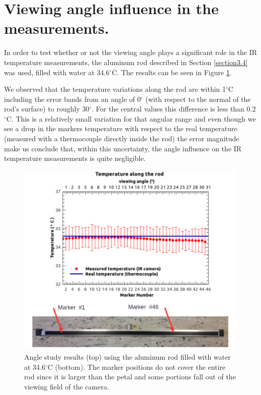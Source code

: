 	\section{Viewing angle influence in the measurements.}\label{section4.5}
	
		In order to test whether or not the viewing angle plays a significant role in the IR temperature measurements, the aluminum rod described in Section \ref{section3.4} was used, filled with water at 34.6\space$^{\circ}$C. The results can be seen in Figure \ref{fig4.8}. 
		
		We observed that the temperature variations along the rod are within 1\space$^{\circ}$C including the error bands from an angle of 0$^\circ$ (with respect to the normal of the rod’s surface) to roughly 30$^\circ$. For the central values this difference is less than 0.2\space$^{\circ}$C. This is a relatively small variation for that angular range and even though we see a drop in the markers temperature with respect to the real temperature (measured with a thermocouple directly inside the rod) the error magnitude make us conclude that, within this uncertainty, the angle influence on the IR temperature measurements is quite negligible.
		
		\begin{figure}[H]
			\centering
			\captionsetup{justification=centering,margin=0cm}
			\includegraphics[scale=0.4]{Figures/Chapter04/RodAngularTempResults.jpg}
			\caption{Angle study results (top) using the aluminum rod filled with water at 34.6\space$^{\circ}$C (bottom). The marker positions do not cover the entire rod since it is larger than the petal and some portions fall out of the viewing field of the camera.}\label{fig4.8}
		\end{figure}
	
	